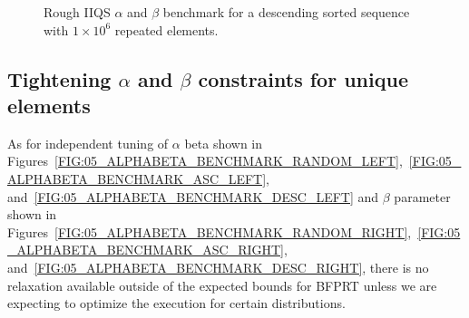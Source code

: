 \begin{figure}


    
    \caption{Rough IIQS $\alpha$ and $\beta$ benchmark for a descending sorted sequence with $1\times10^6$ repeated elements.}
    \label{FIG:05_ALPHABETA_BENCHMARK_DESC}
\end{figure}


\subsection{Tightening $\alpha$ and $\beta$ constraints for unique elements}

As for independent tuning of $\alpha$ beta shown in Figures~\ref{FIG:05_ALPHABETA_BENCHMARK_RANDOM_LEFT},~\ref{FIG:05_ALPHABETA_BENCHMARK_ASC_LEFT}, and~\ref{FIG:05_ALPHABETA_BENCHMARK_DESC_LEFT} and $\beta$ parameter shown in Figures~\ref{FIG:05_ALPHABETA_BENCHMARK_RANDOM_RIGHT},~\ref{FIG:05_ALPHABETA_BENCHMARK_ASC_RIGHT}, and~\ref{FIG:05_ALPHABETA_BENCHMARK_DESC_RIGHT}, there is no relaxation available outside of the expected bounds for BFPRT unless we are expecting to optimize the execution for certain distributions.\\

